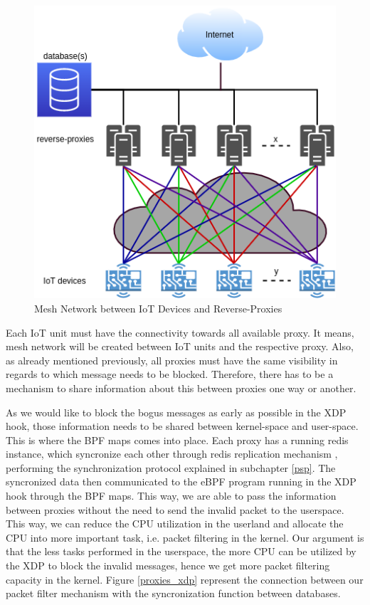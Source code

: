 \documentclass[sigplan,screen]{acmart}
\begin{document}
\begin{figure}[htbp]
\centerline{\includegraphics[scale=0.35]{pic/proxies.png}}
\caption{Mesh Network between IoT Devices and Reverse-Proxies}
\label{proxies}
\end{figure}

Each IoT unit must have the connectivity towards all available proxy. It means, mesh network will be created between IoT units and the respective proxy. Also, as already mentioned previously, all proxies must have the same visibility in regards to which message needs to be blocked. Therefore, there has to be a mechanism to share information about this between proxies one way or another. 

As we would like to block the bogus messages as early as possible in the XDP hook, those information needs to be shared between kernel-space and user-space. This is where the BPF maps comes into place. Each proxy has a running redis instance, which syncronize each other through redis replication mechanism \cite{redissync}, performing the synchronization protocol explained in subchapter \ref{psp}. The syncronized data then communicated to the eBPF program running in the XDP hook through the BPF maps. This way, we are able to pass the information between proxies without the need to send the invalid packet to the userspace. This way, we can reduce the CPU utilization in the userland and allocate the CPU into more important task, i.e. packet filtering in the kernel. Our argument is that the less tasks performed in the userspace, the more CPU can be utilized by the XDP to block the invalid messages, hence we get more packet filtering capacity in the kernel. Figure \ref{proxies_xdp} represent the connection between our packet filter mechanism with the syncronization function between databases.
\end{document}
